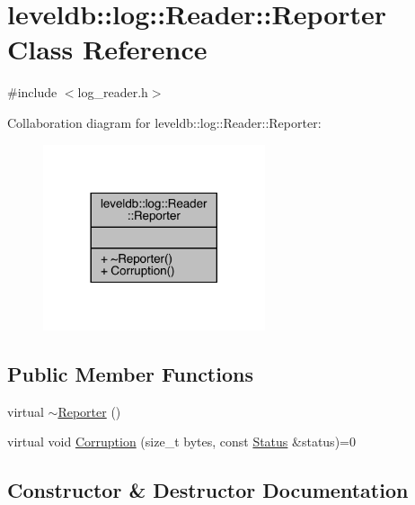 \hypertarget{classleveldb_1_1log_1_1_reader_1_1_reporter}{}\section{leveldb\+::log\+::Reader\+::Reporter Class Reference}
\label{classleveldb_1_1log_1_1_reader_1_1_reporter}


{\ttfamily \#include $<$log\+\_\+reader.\+h$>$}



Collaboration diagram for leveldb\+::log\+::Reader\+::Reporter\+:
\nopagebreak
\begin{figure}[H]
\begin{center}
\leavevmode
\includegraphics[width=185pt]{classleveldb_1_1log_1_1_reader_1_1_reporter__coll__graph}
\end{center}
\end{figure}
\subsection*{Public Member Functions}
\begin{DoxyCompactItemize}
\item 
virtual \mbox{\hyperlink{classleveldb_1_1log_1_1_reader_1_1_reporter_a7dddb01b6aec1f9c4b4a5ae65af10a92}{$\sim$\+Reporter}} ()
\item 
virtual void \mbox{\hyperlink{classleveldb_1_1log_1_1_reader_1_1_reporter_a2d28d30f9559d5fc9f94af41d239932e}{Corruption}} (size\+\_\+t bytes, const \mbox{\hyperlink{classleveldb_1_1_status}{Status}} \&status)=0
\end{DoxyCompactItemize}


\subsection{Constructor \& Destructor Documentation}
\mbox{\label{classleveldb_1_1log_1_1_reader_1_1_reporter_a7dddb01b6aec1f9c4b4a5ae65af10a92}} 
